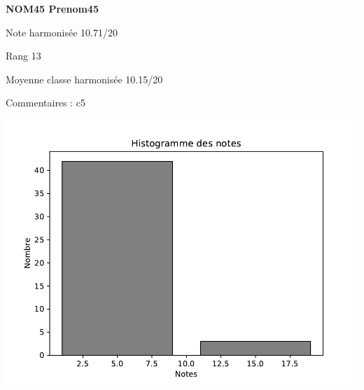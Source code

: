 \begin{minipage}[c]{.45\linewidth} 
\Large \textbf{\textsf{NOM45 Prenom45}} 
 
 \normalsize Note harmonisée 10.71/20 
 
Rang 13
 
Moyenne classe harmonisée 10.15/20 
 
Commentaires : 
c5 
\end{minipage}\hfill 
\begin{minipage}[c]{.45\linewidth}  
\begin{center}
\includegraphics[width=.8\linewidth]{../histo.pdf} 
\end{center}
\end{minipage}
\footnotesize 
